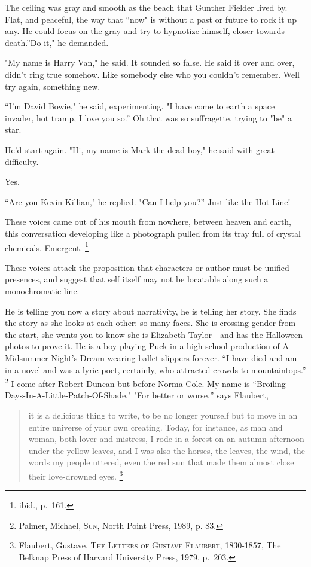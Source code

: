 \documentclass[
]{memoir}
\begin{document}
The ceiling was gray and smooth as the beach that Gunther Fielder lived
by. Flat, and peaceful, the way that ``now" is without a past or future
to rock it up any. He could focus on the gray and try to hypnotize
himself, closer towards death.''Do it," he demanded.

"My name is Harry Van," he said. It sounded so false. He said it over
and over, didn't ring true somehow. Like somebody else who you couldn't
remember. Well try again, something new.

``I'm David Bowie," he said, experimenting. "I have come to earth a
space invader, hot tramp, I love you so.'' Oh that was so suffragette,
trying to "be" a star.

He'd start again. "Hi, my name is Mark the dead boy," he said with great
difficulty.

Yes.

``Are you Kevin Killian," he replied. "Can I help you?'' Just like the
Hot Line!

These voices came out of his mouth from nowhere, between heaven and
earth, this conversation developing like a photograph pulled from its
tray full of crystal chemicals. Emergent. \footnote{ibid., p.~161.}

These voices attack the proposition that characters or author must be
unified presences, and suggest that self itself may not be locatable
along such a monochromatic line.

He is telling you now a story about narrativity, he is telling her
story. She finds the story as she looks at each other: so many faces.
She is crossing gender from the start, she wants you to know she is
Elizabeth Taylor---and has the Halloween photos to prove it. He is a boy
playing Puck in a high school production of A Midsummer Night's Dream
wearing ballet slippers forever. ``I have died and am in a novel and was
a lyric poet, certainly, who attracted crowds to mountaintops.''
\footnote{Palmer, Michael, \textsc{Sun}, North Point Press, 1989, p. 83.}
I come after Robert Duncan but before Norma Cole. My name is
``Broiling-Days-In-A-Little-Patch-Of-Shade." "For better or worse,''
says Flaubert,

\begin{quote}
it is a delicious thing to write, to be no longer yourself but to move
in an entire universe of your own creating. Today, for instance, as man
and woman, both lover and mistress, I rode in a forest on an autumn
afternoon under the yellow leaves, and I was also the horses, the
leaves, the wind, the words my people uttered, even the red sun that
made them almost close their love-drowned eyes. \footnote{Flaubert,
  Gustave, \textsc{The Letters of Gustave Flaubert, 1830-1857}, The
  Belknap Press of Harvard University Press, 1979, p.~203.}
\end{quote}
\end{document}
